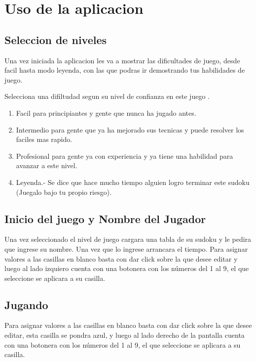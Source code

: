 \documentclass[11pt,fleqn]{book} %
\begin{document}
\chapter{Uso de la aplicacion}

\section{Seleccion de niveles}

Una vez iniciada la aplicacion les va a mostrar las dificultades de juego, desde facil hasta modo leyenda, con las que podras ir demostrando tus habilidades de juego.

Selecciona una difiltudad segun su nivel de confianza en este juego .
\begin{enumerate}
\item Facil para principiantes y gente que nunca ha jugado antes.
\item Intermedio para gente que ya ha mejorado sus tecnicas y puede resolver los faciles mas rapido.
\item Profesional para gente ya con experiencia y ya tiene una habilidad para avanzar a este nivel.
\item Leyenda.- Se dice que hace mucho tiempo alguien logro terminar este sudoku (Juegalo bajo tu propio riesgo).
\end{enumerate}



\section{Inicio del juego y Nombre del Jugador}

Una vez seleccionado el nivel de juego cargara una tabla de su sudoku y le pedira que ingrese su nombre. Una vez que lo ingrese arrancara el tiempo.
Para asignar valores a las casillas en blanco basta con dar click sobre la que desee editar y luego al lado izquiero cuenta con una botonera con los números del 1 al 9, el que seleccione se aplicara a su casilla.

\section{Jugando}

Para asignar valores a las casillas en blanco basta con dar click sobre la que desee editar, esta casilla se pondra azul, y luego al lado derecho de la pantalla cuenta con una botonera con los números del 1 al 9, el que seleccione se aplicara a su casilla.
\end{document}

